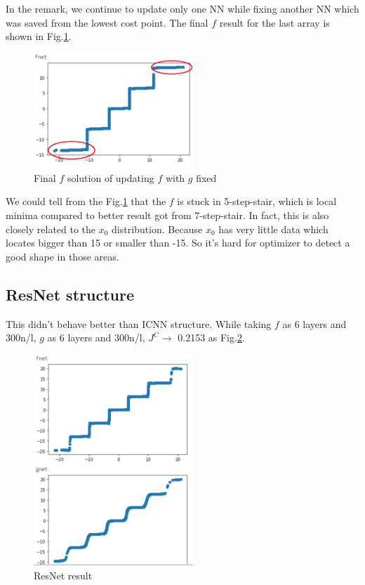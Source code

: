 \documentclass[conference,compsoc]{IEEEtran}
\begin{document}
  In the remark, we continue to update only one NN while fixing another NN which was saved from the lowest cost point. The final $f$ result for the last array is shown in Fig.\ref{fig:Table2_last_column_continue_to_update_f}.
\begin{figure}[htp]
    \centering
    \includegraphics[width=6cm]{images/Table2_last_column_continue_to_update_f.png}
    \caption{Final $f$ solution of updating $f$ with $g$ fixed}
    \label{fig:Table2_last_column_continue_to_update_f}
\end{figure}

We could tell from the Fig.\ref{fig:Table2_last_column_continue_to_update_f} that the $f$ is stuck in 5-step-stair, which is local minima compared to better result got from 7-step-stair. In fact, this is also closely related to the $x_0$ distribution. Because $x_0$ has very little data which locates bigger than 15 or smaller than -15. So it's hard for optimizer to detect a good shape in those areas.

\subsection{ResNet structure}
This didn't behave better than ICNN structure. While taking $f$ as 6 layers and 300n/l, $g$ as 6 layers and 300n/l, $J^C\rightarrow$ 0.2153 as Fig.\ref{fig:resnet_best_result}.
\begin{figure}[htp]
  \centering
  \includegraphics[width=6cm]{images/resnet_best_result.png}
  \caption{ResNet result}
  \label{fig:resnet_best_result}
\end{figure}
\end{document}
